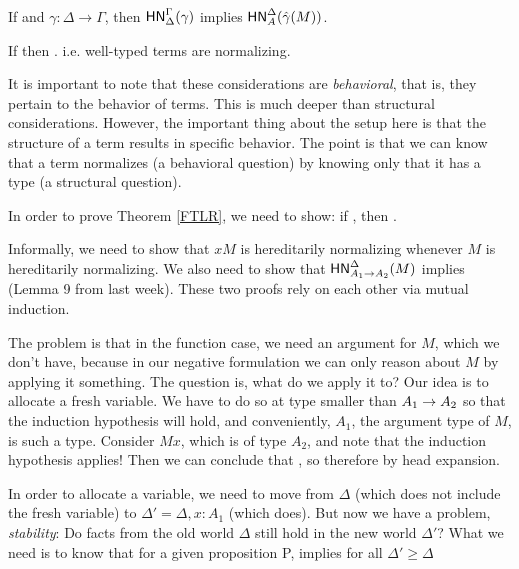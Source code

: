 \documentclass{article}
\begin{document}
\begin{theorem}
\label{FTLR}
If  and $\gamma: \Delta \to \Gamma$, then $\mathsf{HN}^{\Gamma}_{\Delta}(\gamma)$ implies $\mathsf{HN}^{\Delta}_{A}(\hat{\gamma}(M))$.
 \end{theorem}

 \begin{corollary}
  If  then . i.e. well-typed terms are normalizing.
 \end{corollary}

 It is important to note that these considerations are \textit{behavioral}, that is, they pertain to the behavior of terms. This is much deeper than structural considerations. However, the important thing about the setup here is that the structure of a term results in specific behavior. The point is that we can know that a term normalizes (a behavioral question) by knowing only that it has a type (a structural question).

In order to prove Theorem \ref{FTLR}, we need to show: if , then .

Informally, we need to show that $xM$ is hereditarily normalizing whenever $M$ is hereditarily normalizing. We also need to show that $\mathsf{HN}^{\Delta}_{A_1 \to A_2}(M)$ implies  (Lemma 9 from last week). These two proofs rely on each other via mutual induction.

The problem is that in the function case, we need an argument for $M$, which we don't have, because in our negative formulation we can only reason about $M$ by applying it something. The question is, what do we apply it to? Our idea is to allocate a fresh variable. We have to do so at type smaller than $A_1 \to A_2$ so that the induction hypothesis will hold, and conveniently, $A_1$, the argument type of $M$, is such a type. Consider $Mx$, which is of type $A_2$, and note that the induction hypothesis applies! Then we can conclude that , so therefore  by head expansion.

In order to allocate a variable, we need to move from $\Delta$ (which does not include the fresh variable) to $\Delta' = \Delta, x: A_1$ (which does). But now we have a problem, \textit{stability}: Do facts from the old world $\Delta$ still hold in the new world $\Delta'$? What we need is to know that for a given proposition P,  implies  for all $\Delta' \geq \Delta$
\end{document}
